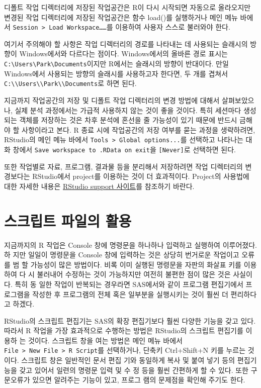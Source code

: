 \documentclass[
]{book}
\begin{document}
디폴트 작업 디렉터리에 저장된 작업공간은 R이 다시 시작되면 자동으로
올라오지만 변경된 작업 디렉터리에 저장된 작업공간은 함수 load()를
실행하거나 메인 메뉴 바에서 \texttt{Session\ \textgreater{}\ Load\ Workspace\ldots{}\ldots{}}를 이용하여
사용자 스스로 불러와야 한다.

여기서 주의해야 할 사항은 작업 디렉터리의 경로를 나타내는 데 사용되는
슬래시의 방향이 Windows에서와 다르다는 점이다. Windows에서의 올바른 경로
표시는 \texttt{C:\textbackslash{}Users\textbackslash{}Park\textbackslash{}Documents}이지만 R에서는 슬래시의 방향이 반대이다.
만일 Windows에서 사용되는 방향의 슬래시를 사용하고자 한다면, 두 개를
겹쳐서 \texttt{C:\textbackslash{}\textbackslash{}Users\textbackslash{}\textbackslash{}Park\textbackslash{}\textbackslash{}Documents}로 하면 된다.

지금까지 작업공간의 저장 및 디폴트 작업 디렉터리의 변경 방법에 대해서
살펴보았으나, 실제 분석 과정에서는 가급적 사용하지 않는 것이 좋을
것이다. 특히 세션마다 생성되는 객체를 저장하는 것은 차후 분석에 혼선을
줄 가능성이 있기 때문에 반드시 금해야 할 사항이라고 본다. R 종료 시에
작업공간의 저장 여부를 묻는 과정을 생략하려면, RStudio의 메인 메뉴
바에서 \texttt{Tools\ \textgreater{}\ Global\ options...}를 선택하고 나타나는 대화 창에서
\texttt{Save\ workspace\ to\ .RData\ on\ exit}을 \texttt{{[}Never{]}}로 선택하면 된다.

또한 작업별로 자료, 프로그램, 결과물 등을 분리해서 저장하려면 작업
디렉터리의 변경보다는 RStudio에서 project를 이용하는 것이 더 효과적이다.
Project의 사용법에 대한 자세한 내용은 \href{https://support.rstudio.com}{RStudio support
사이트}를 참조하기 바란다.

\hypertarget{uxc2a4uxd06cuxb9bduxd2b8-uxd30cuxc77cuxc758-uxd65cuxc6a9}{%
\section{스크립트 파일의 활용}\label{uxc2a4uxd06cuxb9bduxd2b8-uxd30cuxc77cuxc758-uxd65cuxc6a9}}

지금까지의 R 작업은 Console 창에 명령문을 하나하나 입력하고 실행하여
이루어졌다. 하 지만 일일이 명령문을 Console 창에 입력하는 것은 상당히
번거로운 작업이고 오류를 범 할 가능성이 많은 방법이다. 비록 이미 실행된
명령문을 자판의 화살표 키를 이용하여 다 시 불러내어 수정하는 것이
가능하지만 여전히 불편한 점이 많은 것은 사실이다. 특히 동 일한 작업이
반복되는 경우라면 SAS에서와 같이 프로그램 편집기에서 프로그램을 작성한
후 프로그램의 전체 혹은 일부분을 실행시키는 것이 훨씬 더 편리하다고
하겠다.

RStudio의 스크립트 편집기는 SAS의 확장 편집기보다 훨씬 다양한 기능을
갖고 있다. 따라서 R 작업을 가장 효과적으로 수행하는 방법은 RStudio의
스크립트 편집기를 이용하 는 것이다. 스크립트 창을 여는 방법은 메인 메뉴
바에서 \texttt{File\ \textgreater{}\ New\ File\ \textgreater{}\ R\ Script}를 선택하거나, 단축키 Ctrl+Shift+N
키를 누르는 것이다. 스크립트 창은 일반적인 문서 편집 기와 동일하게 복사
및 붙여 넣기 등의 편집기능을 갖고 있어서 일련의 명령문 입력 및 수 정
등을 훨씬 간편하게 할 수 있다. 또한 구문오류가 있으면 알려주는 기능이
있고, 프로그 램의 문제점을 확인해 주기도 한다.
\end{document}
